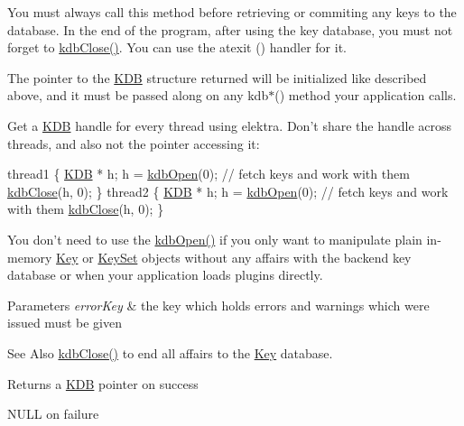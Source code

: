 You must always call this method before retrieving or commiting any keys to the database. In the end of the program, after using the key database, you must not forget to \hyperlink{group__kdb_gadb54dc9fda17ee07deb9444df745c96f}{kdb\-Close()}. You can use the atexit () handler for it.

The pointer to the {\ttfamily \hyperlink{classkdb_1_1KDB}{K\-D\-B}} structure returned will be initialized like described above, and it must be passed along on any kdb$\ast$() method your application calls.

Get a {\ttfamily \hyperlink{classkdb_1_1KDB}{K\-D\-B}} handle for every thread using elektra. Don't share the handle across threads, and also not the pointer accessing it\-: 
\begin{DoxyCode}
thread1
\{
        \hyperlink{classkdb_1_1KDB_a7e0637995ce9f294cdbc6f167df6db40}{KDB} * h;
        h = \hyperlink{group__kdb_ga6808defe5870f328dd17910aacbdc6ca}{kdbOpen}(0);
        \textcolor{comment}{// fetch keys and work with them}
        \hyperlink{group__kdb_gadb54dc9fda17ee07deb9444df745c96f}{kdbClose}(h, 0);
\}
thread2
\{
        \hyperlink{classkdb_1_1KDB_a7e0637995ce9f294cdbc6f167df6db40}{KDB} * h;
        h = \hyperlink{group__kdb_ga6808defe5870f328dd17910aacbdc6ca}{kdbOpen}(0);
        \textcolor{comment}{// fetch keys and work with them}
        \hyperlink{group__kdb_gadb54dc9fda17ee07deb9444df745c96f}{kdbClose}(h, 0);
\}
\end{DoxyCode}


You don't need to use the \hyperlink{group__kdb_ga6808defe5870f328dd17910aacbdc6ca}{kdb\-Open()} if you only want to manipulate plain in-\/memory \hyperlink{classkdb_1_1Key}{Key} or \hyperlink{classkdb_1_1KeySet}{Key\-Set} objects without any affairs with the backend key database or when your application loads plugins directly.


\begin{DoxyParams}{Parameters}
{\em error\-Key} & the key which holds errors and warnings which were issued must be given \\
\hline
\end{DoxyParams}
\begin{DoxySeeAlso}{See Also}
\hyperlink{group__kdb_gadb54dc9fda17ee07deb9444df745c96f}{kdb\-Close()} to end all affairs to the \hyperlink{group__key}{Key} database. 
\end{DoxySeeAlso}
\begin{DoxyReturn}{Returns}
a \hyperlink{classkdb_1_1KDB}{K\-D\-B} pointer on success 

N\-U\-L\-L on failure 
\end{DoxyReturn}
 

